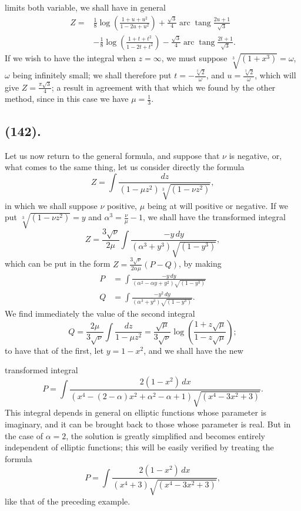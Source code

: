 \documentclass{article}
\begin{document}
limits both variable, we shall have in general
\[ \begin{aligned} Z={}&\tfrac{1}{8}\log\left(\frac{1+u+u^{2}}{1-2u+u^{2}}\right)+\frac{\sqrt{3}}{4}\operatorname{arc}\operatorname{tang}\frac{2u+1}{\sqrt{3}}\\ &-\tfrac{1}{8}\log\left(\frac{1+t+t^{2}}{1-2t+t^{2}}\right)-\frac{\sqrt{3}}{4}\operatorname{arc}\operatorname{tang}\frac{2t+1}{\sqrt{3}}. \end{aligned} \]
If we wish to have the integral when $z=\infty$, we must suppose $\sqrt[3]{(1+x^{3})}=\omega$, $\omega$ being infinitely small; we shall therefore put $t=-\frac{\sqrt[3]{2}}{\omega}$, and $u=\frac{\sqrt[3]{2}}{\omega}$, which will give $Z=\frac{\pi\sqrt{3}}{4}$; a result in agreement with that which we found by the other method, since in this case we have $\mu=\frac{1}{3}$.

\subsection*{(142).}

Let us now return to the general formula, and suppose that $\nu$ is negative, or, what comes to the same thing, let us consider directly the formula
\[ Z=\int\frac{dz}{(1-\mu z^{2})\sqrt[3]{(1-\nu z^{2})}}, \]
in which we shall suppose $\nu$ positive, $\mu$ being at will positive or negative. If we put $\sqrt[3]{(1-\nu z^{2})}=y$ and $\alpha^{3}=\frac{\nu}{\mu}-1$, we shall have the transformed integral
\[ Z=\frac{3\sqrt{\nu}}{2\mu}\int\frac{-y\,dy}{(\alpha^{3}+y^{3})\sqrt{(1-y^{3})}}, \]
which can be put in the form $Z=\frac{3\sqrt{\nu}}{2\alpha\mu}(P-Q)$, by making
\[ \begin{aligned} P&=\int\frac{-y\,dy}{(\alpha^{2}-\alpha y+y^{2})\sqrt{(1-y^{3})}}\\ Q&=\int\frac{-y^{2}\,dy}{(\alpha^{3}+y^{3})\sqrt{(1-y^{3})}}. \end{aligned} \]
We find immediately the value of the second integral
\[ Q=\frac{2\mu}{3\sqrt{\nu}}\int\frac{dz}{1-\mu z^{2}}=\frac{\sqrt{\mu}}{3\sqrt{\nu}}\log\left(\frac{1+z\sqrt{\mu}}{1-z\sqrt{\mu}}\right); \]
to have that of the first, let $y=1-x^{2}$, and we shall have the new

transformed integral
\[ P=\int\frac{2(1-x^{2})\,dx}{(x^{4}-(2-\alpha)x^{2}+\alpha^{2}-\alpha+1)\sqrt{(x^{4}-3x^{2}+3)}}. \]
This integral depends in general on elliptic functions whose parameter is imaginary, and it can be brought back to those whose parameter is real. But in the case of $\alpha=2$, the solution is greatly simplified and becomes entirely independent of elliptic functions; this will be easily verified by treating the formula
\[ P=\int\frac{2(1-x^{2})\,dx}{(x^{4}+3)\sqrt{(x^{4}-3x^{2}+3)}}, \]
like that of the preceding example.
\end{document}
